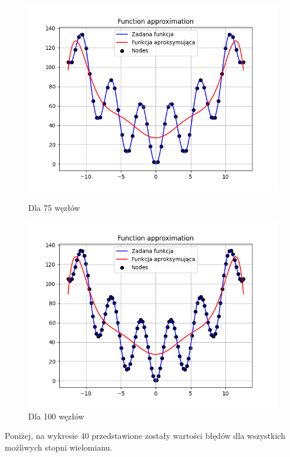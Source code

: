 \documentclass{article}
\begin{document}
\begin{figure}[H]
\begin{minipage}[b]{0.49\textwidth}
    \begin{minipage}[b]{\textwidth}
      \includegraphics[width=\textwidth]{img38.png}
      \caption{Dla 75 węzłów}
    \end{minipage}
    \vspace*{\fill}
    \begin{minipage}[b]{\textwidth}
      \includegraphics[width=\textwidth]{img39.png}
      \caption{Dla 100 węzłów}
    \end{minipage}
  \end{minipage}
\end{figure}

Poniżej, na wykresie 40 przedstawione zostały wartości błędów dla wszystkich możliwych stopni wielomianu.
\end{document}
